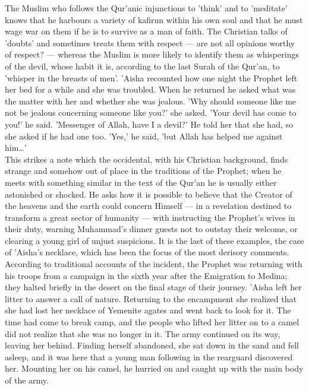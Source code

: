 \documentclass[11pt, b5paper, twoside]{book}
\begin{document}
The Muslim who follows the Qur'anic injunctions to 'think' and to 'meditate' knows that he harbours a 
variety of kafirun within his own soul and that he must wage war on them if he is to survive as a man 
of faith. The Christian talks of 'doubts' and sometimes treats them with respect --- are not all 
opinions worthy of respect? --- whereas the Muslim is more likely to identify them as whisperings of 
the devil, whose habit it is, according to the last Surah of the Qur'an, to 'whisper in the breasts 
of men'. 'Aisha recounted how one night the Prophet left her bed for a while and she was troubled. 
When he returned he asked what was the matter with her and whether she was jealous. 'Why should 
someone like me not be jealous concerning someone like you?' she asked. 'Your devil has come to you!' 
he said. 'Messenger of Allah, have I a devil?' He told her that she had, so she asked if he had one 
too. 'Yes,' he said, 'but Allah has helped me against him\ldots{}' \\

This strikes a note which the occidental, with his Christian background, finds strange and somehow 
out of place in the traditions of the Prophet; when he meets with something similar in the text of 
the Qur'an he is usually either astonished or shocked. He asks how it is possible to believe that the 
Creator of the heavens and the earth could concern Himself --- in a revelation destined to transform a 
great sector of humanity --- with instructing the Prophet's wives in their duty, warning Muhammad's 
dinner guests not to outstay their welcome, or clearing a young girl of unjust suspicions. It is the 
last of these examples, the case of 'Aisha's necklace, which has been the focus of the most derisory 
comments. \\

According to traditional accounts of the incident, the Prophet was returning with his troops from a 
campaign in the sixth year after the Emigration to Medina; they halted briefly in the desert on the 
final stage of their journey. 'Aisha left her litter to answer a call of nature. Returning to the 
encampment she realized that she had lost her necklace of Yemenite agates and went back to look for 
it. The time had come to break camp, and the people who lifted her litter on to a camel did not 
realize that she was no longer in it. The army continued on its way, leaving her behind. Finding 
herself abandoned, she sat down in the sand and fell asleep, and it was here that a young man 
following in the rearguard discovered her. Mounting her on his camel, he hurried on and caught up 
with the main body of the army. \\
\end{document}
